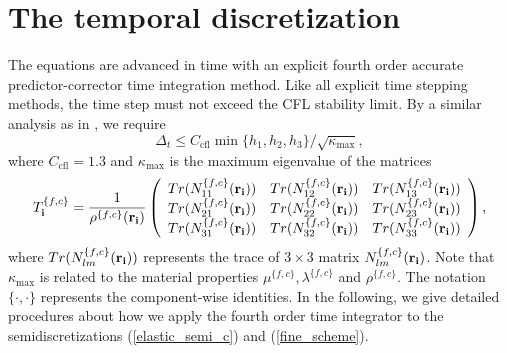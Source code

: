 \section{The temporal discretization}
The equations are advanced in time with an explicit fourth order accurate predictor-corrector time integration method. Like all explicit time stepping methods, the time step must not exceed the CFL stability limit. By a similar analysis as in \cite{sjogreen2012fourth}, we require 
\begin{equation*}
\Delta_t\leq C_{\text{cfl}}\min\{h_1,h_2,h_3\}/\sqrt{\kappa_{\max}},
\end{equation*}
where $C_{\text{cfl}} = 1.3$ and
$\kappa_{\text{max}}$ is the maximum eigenvalue of the matrices 
\[T_{\bf i}^{\{f,c\}} = \frac{1}{\rho^{\{f,c\}}({\bf r}_{\bf i})}\left(\begin{array}{ccc}
Tr(N_{11}^{\{f,c\}}({\bf r}_{\bf i})) &  Tr(N_{12}^{\{f,c\}}({\bf r}_{\bf i}))& Tr(N_{13}^{\{f,c\}}({\bf r}_{\bf i}))\\
Tr(N_{21}^{\{f,c\}}({\bf r}_{\bf i})) & Tr(N_{22}^{\{f,c\}}({\bf r}_{\bf i})) & Tr(N_{23}^{\{f,c\}}({\bf r}_{\bf i}))\\
Tr(N_{31}^{\{f,c\}}({\bf r}_{\bf i})) & Tr(N_{32}^{\{f,c\}}({\bf r}_{\bf i})) & Tr(N_{33}^{\{f,c\}}({\bf r}_{\bf i}))\end{array}\right), \]
where $Tr(N_{lm}^{\{f,c\}}({\bf r}_{\bf i}))$ represents the trace of $3\times3$ matrix $N_{lm}^{\{f,c\}}({\bf r}_{\bf i})$. Note that $\kappa_{\text{max}}$ is related to the material properties $\mu^{\{f,c\}}, \lambda^{\{f,c\}}$ and $\rho^{\{f,c\}}$. The notation $\{\cdot,\cdot\}$ represents the component-wise identities. In the following, we give detailed procedures about how we apply the fourth order time integrator to the semidiscretizations (\ref{elastic_semi_c}) and  (\ref{fine_scheme}). 

